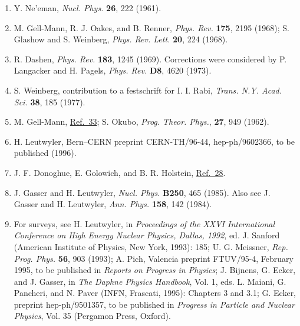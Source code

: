 \begin{enumerate}
\item {}\label{ch19-ref-34}
Y. Ne'eman, \emph{Nucl. Phys.} \textbf{26}, 222 (1961).

\item {}\label{ch19-ref-35}
M. Gell-Mann, R. J. Oakes, and B. Renner, \emph{Phys. Rev.} \textbf{175}, 2195 (1968); S. Glashow and S. Weinberg, \emph{Phys. Rev. Lett.} \textbf{20}, 224 (1968).

\item {}\label{ch19-ref-36}
R. Dashen, \emph{Phys. Rev.} \textbf{183}, 1245 (1969). Corrections were considered by P. Langacker and H. Pagels, \emph{Phys. Rev.} \textbf{D8}, 4620 (1973).

\item {}\label{ch19-ref-37}
S. Weinberg, contribution to a festschrift for I. I. Rabi, \emph{Trans. N.Y. Acad. Sci.} \textbf{38}, 185 (1977).

\item {}\label{ch19-ref-38}
M. Gell-Mann, \hyperref[ch19-ref-33]{Ref.~33}; S. Okubo, \emph{Prog. Theor. Phys.}, \textbf{27}, 949 (1962).

\item[38a.] \label{ch19-ref-38a}
H. Leutwyler, Bern--CERN preprint CERN-TH/96-44, hep-ph/9602366, to be published (1996).

\item[38b.] \label{ch19-ref-38b}
J. F. Donoghue, E. Golowich, and B. R. Holstein, \hyperref[ch19-ref-28]{Ref.~28}.

\item {}\label{ch19-ref-39}
J. Gasser and H. Leutwyler, \emph{Nucl. Phys.} \textbf{B250}, 465 (1985). Also see J. Gasser and H. Leutwyler, \emph{Ann. Phys.} \textbf{158}, 142 (1984).

\item {}\label{ch19-ref-40}
For surveys, see H. Leutwyler, in \emph{Proceedings of the XXVI International Conference on High Energy Nuclear Physics, Dallas, 1992}, ed. J. Sanford (American Institute of Physics, New York, 1993): 185; U. G. Meissner, \emph{Rep. Prog. Phys.} \textbf{56}, 903 (1993); A. Pich, Valencia preprint FTUV/95-4, February 1995, to be published in \emph{Reports on Progress in Physics}; J. Bijnens, G. Ecker, and J. Gasser, in \emph{The Daphne Physics Handbook}, Vol. 1, eds. L. Maiani, G. Pancheri, and N. Paver (INFN, Frascati, 1995): Chapters 3 and 3.1; G. Ecker, preprint hep-ph/9501357, to be published in \emph{Progress in Particle and Nuclear Physics}, Vol. 35 (Pergamon Press, Oxford).


\end{enumerate}
